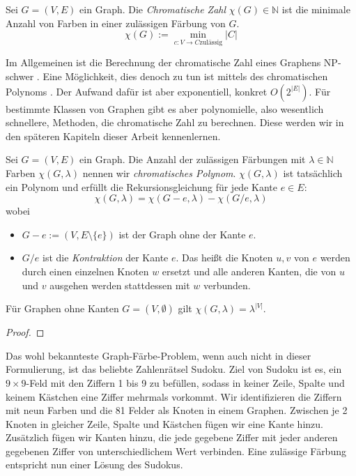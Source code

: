 \documentclass[../main.tex]{subfiles}
\begin{document}
\begin{definition}
    Sei $G = (V, E)$ ein Graph. Die \emph{Chromatische Zahl} $\chi(G) \in \mathbb N$ ist die minimale Anzahl von Farben in einer zulässigen Färbung von $G$.
    \begin{equation*}
        \chi(G) := \min\limits_{c: V \to C \text{zulässig}} |C|
    \end{equation*}
\end{definition}

Im Allgemeinen ist die Berechnung der chromatische Zahl eines Graphens NP-schwer \cite{Karp1972}. Eine Möglichkeit, dies denoch zu tun ist mittels des chromatischen Polynoms . Der Aufwand dafür ist aber exponentiell, konkret $O(2^{|E|})$. Für bestimmte Klassen von Graphen gibt es aber polynomielle, also wesentlich schnellere, Methoden, die chromatische Zahl zu berechnen. Diese werden wir in den späteren Kapiteln dieser Arbeit kennenlernen.

\begin{satz}
    Sei $G = (V, E)$ ein Graph. Die Anzahl der zulässigen Färbungen mit $\lambda \in \mathbb N$ Farben $\chi(G, \lambda)$ nennen wir \emph{chromatisches Polynom}. $\chi(G, \lambda)$ ist tatsächlich ein Polynom und erfüllt die Rekursionsgleichung für jede Kante $e \in E$:
    \begin{equation*}
        \chi(G, \lambda) = \chi(G - e, \lambda) - \chi(G/e, \lambda)
    \end{equation*}
    wobei
    \begin{itemize}
        \item $G - e := (V, E \setminus \{e\})$ ist der Graph ohne der Kante $e$.
        \item $G/e$ ist die \emph{Kontraktion} der Kante $e$. Das heißt die Knoten $u, v$ von $e$ werden durch einen einzelnen Knoten $w$ ersetzt und alle anderen Kanten, die von $u$ und $v$ ausgehen werden stattdessen mit $w$ verbunden.
    \end{itemize}
    Für Graphen ohne Kanten $G = (V, \emptyset)$ gilt $\chi(G, \lambda) = \lambda^{|V|}$.
\end{satz}
\begin{proof}
\end{proof}

Das wohl bekannteste Graph-Färbe-Problem, wenn auch nicht in dieser Formulierung, ist das beliebte Zahlenrätsel Sudoku. Ziel von Sudoku ist es, ein $9 \times 9$-Feld mit den Ziffern 1 bis 9 zu befüllen, sodass in keiner Zeile, Spalte und keinem Kästchen eine Ziffer mehrmals vorkommt. Wir identifizieren die Ziffern mit neun Farben und die 81 Felder als Knoten in einem Graphen. Zwischen je 2 Knoten in gleicher Zeile, Spalte und Kästchen fügen wir eine Kante hinzu. Zusätzlich fügen wir Kanten hinzu, die jede gegebene Ziffer mit jeder anderen gegebenen Ziffer von unterschiedlichem Wert verbinden. Eine zulässige Färbung entspricht nun einer Lösung des Sudokus.
\end{document}
